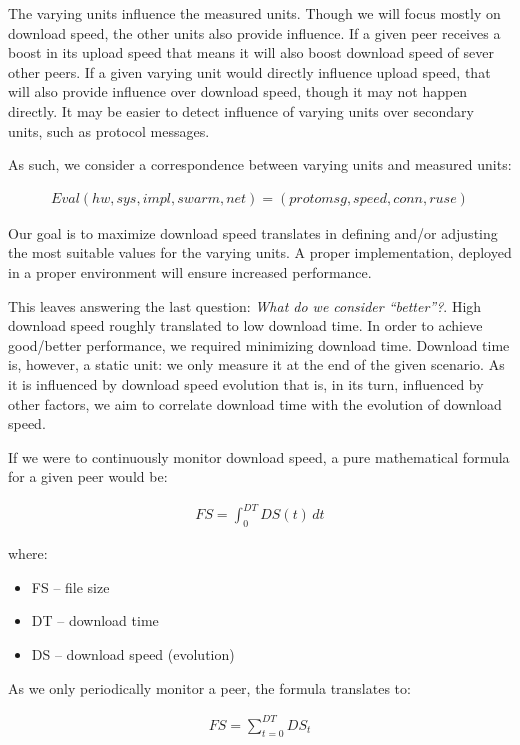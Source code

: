 The varying units influence the measured units. Though we will focus mostly on
download speed, the other units also provide influence. If a given peer
receives a boost in its upload speed that means it will also boost download
speed of sever other peers. If a given varying unit would directly influence
upload speed, that will also provide influence over download speed, though it
may not happen directly. It may be easier to detect influence of varying units
over secondary units, such as protocol messages.

As such, we consider a correspondence between varying units and measured
units:

\begin{align}
\label{eq:proto-measure:eval}
Eval(hw, sys, impl, swarm, net) = (protomsg, speed, conn, ruse)
\end{align}

Our goal is to maximize download speed translates in defining and/or adjusting
the most suitable values for the varying units. A proper implementation,
deployed in a proper environment will ensure increased performance.

This leaves answering the last question: \textit{What do we consider
``better''?}. High download speed roughly translated to low download time. In
order to achieve good/better performance, we required minimizing download
time. Download time is, however, a static unit: we only measure it at the end
of the given scenario. As it is influenced by download speed evolution that
is, in its turn, influenced by other factors, we aim to correlate download
time with the evolution of download speed.

If we were to continuously monitor download speed, a pure mathematical formula
for a given peer would be:

\begin{align}
  FS = \int_0^{DT} DS(t)\,dt
\end{align}

where:

\begin{itemize}
  \item FS -- file size
  \item DT -- download time
  \item DS -- download speed (evolution)
\end{itemize}

As we only periodically monitor a peer, the formula translates to:

\begin{align}
  FS = \sum_{t=0}^{DT} DS_{t}
\end{align}

